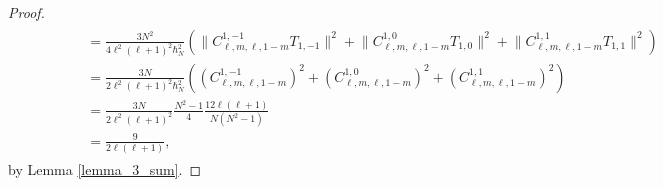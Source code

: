 \documentclass[10pt,a4paper]{amsart}
\begin{document}
\begin{proof}
\begin{gather*}
\begin{split}
&\qquad\qquad=
\frac{3N^2}{4\ell^2(\ell+1)^2\hbar_N^2}\left(
\Big\|C_{\ell,m,\ell,1-m}^{1, -1}T_{1, -1}\Big\|^2 +
\Big\|C_{\ell,m,\ell,1-m}^{1, 0}T_{1, 0}\Big\|^2 +
\Big\|C_{\ell,m,\ell,1-m}^{1, 1}T_{1, 1}\Big\|^2\right) \\
&\qquad\qquad= 
\frac{3N}{2\ell^2(\ell+1)^2\hbar_N^2}\left(
\left(C_{\ell,m,\ell,1-m}^{1, -1}\right)^2 +
\left(C_{\ell,m,\ell,1-m}^{1, 0}\right)^2 +
\left(C_{\ell,m,\ell,1-m}^{1, 1}\right)^2\right) \\
&\qquad\qquad= \frac{3N}{2\ell^2(\ell+1)^2}\frac{N^2-1}{4}\frac{12\ell(\ell+1)}{N(N^2-1)} \\
&\qquad\qquad= \frac{9}{2\ell(\ell+1)},
\end{split}
\end{gather*}
by Lemma \ref{lemma_3_sum}.
\end{proof}
\end{document}
